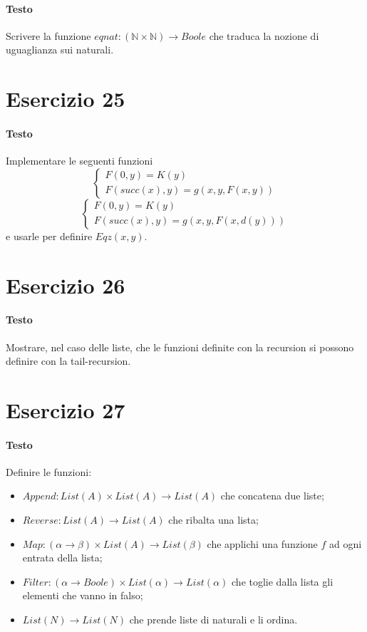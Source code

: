 \documentclass[a4paper,10pt]{article}
\begin{document}
\paragraph{Testo}
Scrivere la funzione $eqnat : (\mathbb{N} \times \mathbb{N}) \rightarrow Boole$ che traduca la nozione di uguaglianza sui naturali.

\section*{Esercizio 25}
\paragraph{Testo}
Implementare le seguenti funzioni
$$\begin{cases} F(0,y) = K(y) \\ F(succ(x),y) = g(x,y,F(x,y)) \end{cases}$$
$$\begin{cases} F(0,y) = K(y) \\ F(succ(x),y) = g(x,y,F(x,d(y))) \end{cases}$$
e usarle per definire $Eqz(x,y)$.

\section*{Esercizio 26}
\paragraph{Testo}
Mostrare, nel caso delle liste, che le funzioni definite con la recursion si possono definire con la tail-recursion.

\section*{Esercizio 27}
\paragraph{Testo}
Definire le funzioni:
\begin{itemize}
\item $Append : List(A) \times List(A) \rightarrow List(A)$ che concatena due liste;
\item $Reverse : List(A) \rightarrow List(A)$ che ribalta una lista;
\item $Map : (\alpha \rightarrow \beta) \times List(A) \rightarrow List(\beta)$ che applichi una funzione $f$ ad ogni entrata della lista;
\item $Filter : (\alpha \rightarrow Boole) \times List(\alpha) \rightarrow List(\alpha)$ che toglie dalla lista gli elementi che vanno in falso;
\item $List(N) \rightarrow List(N)$ che prende liste di naturali e li ordina.
\end{itemize}
\end{document}
